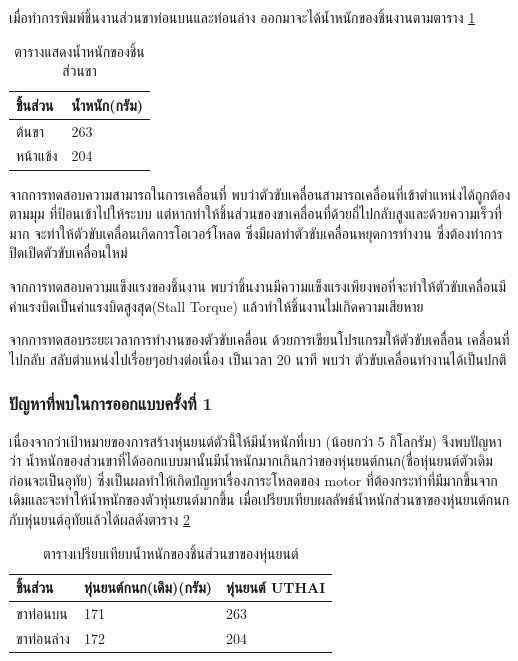 เมื่อทำการพิมพ์ชิ้นงานส่วนขาท่อนบนและท่อนล่าง ออกมาจะได้น้ำหนักของชิ้นงานตามตาราง \ref{tab:UTHAI_leg}
\begin{table}[ht]
	\centering
	\begin{tabular}{| l | l |}
		\hline
		ชิ้นส่วน & น้ำหนัก(กรัม) \\
        \hline
        ต้นขา & 263 \\
        หน้าแข้ง & 204 \\
	    \hline
	\end{tabular}
	\caption{ตารางแสดงน้ำหนักของชิ้นส่วนขา}
	\label{tab:UTHAI_leg}
\end{table}

จากการทดสอบความสามารถในการเคลื่อนที่ พบว่าตัวขับเคลื่อนสามารถเคลื่อนที่เข้าตำแหน่งได้ถูกต้องตามมุม 
ที่ป้อนเข้าไปให้ระบบ แต่หากทำให้ชิ้นส่วนของขาเคลื่อนที่ด้วยถี่ไปกลับสูงและด้วยความเร็วที่มาก จะทำให้ตัวขับเคลื่อนเกิดการโอเวอร์โหลด 
ซึ่งมีผลทำตัวขับเคลื่อนหยุดการทำงาน ซึ่งต้องทำการปิดเปิดตัวขับเคลื่อนใหม่

จากการทดสอบความแข็งแรงของชิ้นงาน พบว่าชิ้นงานมีความแข็งแรงเพียงพอที่จะทำให้ตัวขับเคลื่อนมีค่าแรงบิดเป็นค่าแรงบิดสูงสุด(Stall Torque)
แล้วทำให้ชิ้นงานไม่เกิดความเสียหาย

จากการทดสอบระยะเวลาการทำงานของตัวขับเคลื่อน ด้วยการเขียนโปรแกรมให้ตัวขับเคลื่อน เคลื่อนที่ไปกลับ สลับตำแหน่งไปเรื่อยๆอย่างต่อเนื่อง เป็นเวลา 20 นาที
พบว่า ตัวขับเคลื่อนทำงานได้เป็นปกติ

\subsubsection*{ปัญหาที่พบในการออกแบบครั้งที่ 1}
เนื่องจากว่าเป้าหมายของการสร้างหุ่นยนต์ตัวนี้ให้มีน้ำหนักที่เบา (น้อยกว่า 5 กิโลกรัม) จึงพบปัญหาว่า
น้ำหนักของส่วนขาที่ได้ออกแบบมานั้นมีน้ำหนักมากเกินกว่าของหุ่นยนต์กนก(ชื่อหุ่นยนต์ตัวเดิมก่อนจะเป็นอุทัย)
ซึ่งเป็นผลทำให้เกิดปํญหาเรื่องภาระโหลดของ motor ที่ต้องกระทำที่มีมากขึ้นจากเดิมและจะทำให้น้ำหนักของตัวหุ่นยนต์มากขึ้น 
เมื่อเปรียบเทียบผลลัพธ์น้ำหนักส่วนขาของหุ่นยนต์กนกกับหุ่นยนต์อุทัยแล้วได้ผลดังตาราง \ref{tab:UTHAI_KANOK_Comp}

\begin{table}[ht]
	\centering
	\begin{tabular}{| l | l | l |}
		\hline
        ชิ้นส่วน & หุ่นยนต์กนก(เดิม)(กรัม) & หุ่นยนต์ UTHAI \\
        \hline
        ขาท่อนบน & 171 & 263 \\
        ขาท่อนล่าง & 172 & 204 \\
	    \hline
	\end{tabular}
	\caption{ตารางเปรียบเทียบน้ำหนักของชิ้นส่วนขาของหุ่นยนต์}
	\label{tab:UTHAI_KANOK_Comp}
\end{table}

